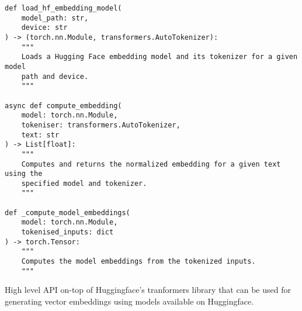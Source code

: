 \begin{listing}[H]
\centering
\renewcommand{\theFancyVerbLine}{\scriptsize\arabic{FancyVerbLine}}
\scriptsize
\begin{verbatim}
def load_hf_embedding_model(
    model_path: str,
    device: str
) -> (torch.nn.Module, transformers.AutoTokenizer):
    """
    Loads a Hugging Face embedding model and its tokenizer for a given model
    path and device.
    """

async def compute_embedding(
    model: torch.nn.Module,
    tokeniser: transformers.AutoTokenizer,
    text: str
) -> List[float]:
    """
    Computes and returns the normalized embedding for a given text using the
    specified model and tokenizer.
    """

def _compute_model_embeddings(
    model: torch.nn.Module,
    tokenised_inputs: dict
) -> torch.Tensor:
    """
    Computes the model embeddings from the tokenized inputs.
    """
\end{verbatim}
\caption{High level API on-top of Huggingface's tranformers library that can be used for generating vector embeddings using models available on Huggingface.}
\label{fig:python-apis-for-embeddings}
\end{listing}
